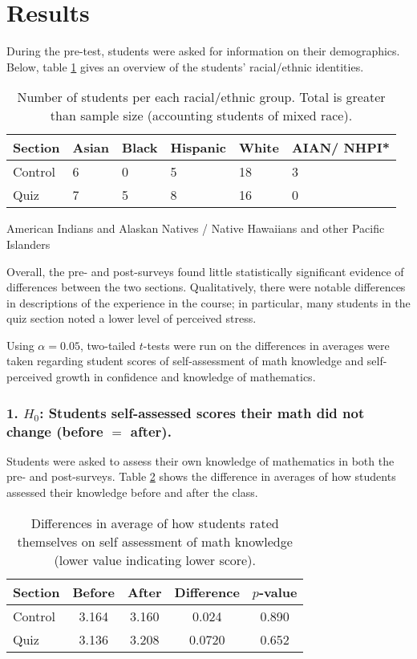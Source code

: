 \section{Results}

During the pre-test, students were asked for information on their demographics. Below, table \ref{table:case_ethnicity} gives an overview of the students' racial/ethnic identities.

\begin{table}[!htb]
  \begin{center}
    \begin{tabular}{l | l | l | l | l | p{1.2cm}}
      Section & Asian & Black & Hispanic & White & AIAN/ NHPI*\\ \hline
      Control & 6 & 0 & 5 & 18 & 3\\
      Quiz & 7 & 5 & 8 & 16 & 0\\
    \end{tabular}
  \end{center}
  {\footnotesize *American Indians and Alaskan Natives / Native Hawaiians and other Pacific Islanders}
  \caption{Number of students per each racial/ethnic group. Total is greater than sample size (accounting students of mixed race).}
  \label{table:case_ethnicity}
\end{table}

Overall, the pre- and post-surveys found little statistically significant evidence of differences between the two sections. Qualitatively, there were notable differences in descriptions of the experience in the course; in particular, many students in the quiz section noted a lower level of perceived stress.

Using $\alpha = 0.05$, two-tailed $t$-tests were run on the differences in averages were taken regarding student scores of self-assessment of math knowledge and self-perceived growth in confidence and knowledge of mathematics.

\subsubsection{1. $H_0$: Students self-assessed scores their math did not change (before $=$ after).}

Students were asked to assess their own knowledge of mathematics in both the pre- and post-surveys. Table \ref{table:means} shows the difference in averages of how students assessed their knowledge before and after the class.

\begin{table}[!htb]
  \begin{center}
    \begin{tabular}{l | c | c | c | c}
      Section & Before & After & Difference & $p$-value\\
      \hline
      Control & 3.164 & 3.160 & 0.024 & 0.890\\
      Quiz & 3.136 & 3.208 & 0.0720 & 0.652
    \end{tabular}
  \end{center}
  \caption{Differences in average of how students rated themselves on self assessment of math knowledge (lower value indicating lower score).}
  \label{table:means}
\end{table}

